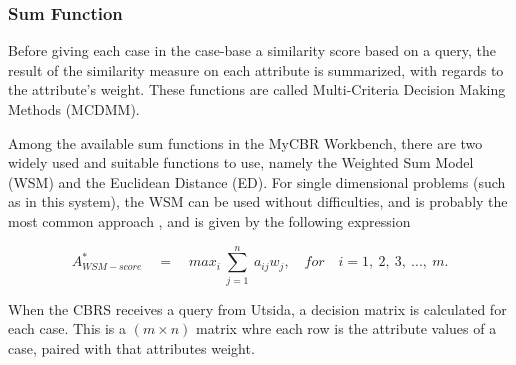 \subsubsection{Sum Function}
Before giving each case in the case-base a similarity score based on a query, the result of the similarity measure on each attribute is summarized, with regards to the attribute's weight. These functions are called Multi-Criteria Decision Making Methods (MCDMM).

Among the available sum functions in the MyCBR Workbench, there are two widely used and suitable functions to use, namely the Weighted Sum Model (WSM) and the Euclidean Distance (ED). For single dimensional problems (such as in this system), the WSM can be used without difficulties, and is probably the most common approach \cite{triantaphyllou2000multi}, and is given by the following expression \cite{fishburn1967letter}

\begin{displaymath}
    A^{*}_{WSM-score}\quad =\quad max_{i}\  \sum\limits_{j = 1}^{n}\  a_{ij}w_{j},\quad for \quad i =1,\ 2,\ 3,\ ...,\ m.
\end{displaymath}

When the CBRS receives a query from Utsida, a decision matrix is calculated for each case. This is a $(m \times n)$ matrix whre each row is the attribute values of a case, paired with that attributes weight. 


